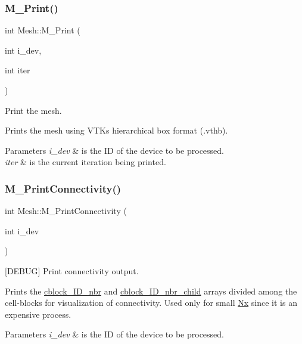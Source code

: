 \subsubsection{\texorpdfstring{M\+\_\+\+Print()}{M\_Print()}}
{\footnotesize\ttfamily int Mesh\+::\+M\+\_\+\+Print (\begin{DoxyParamCaption}\item[{int}]{i\+\_\+dev,  }\item[{int}]{iter }\end{DoxyParamCaption})}



Print the mesh. 

Prints the mesh using V\+TK\textquotesingle{}s hierarchical box format (.vthb). 
\begin{DoxyParams}{Parameters}
{\em i\+\_\+dev} & is the ID of the device to be processed. \\
\hline
{\em iter} & is the current iteration being printed. \\
\hline
\end{DoxyParams}
\mbox{\label{classMesh_a4d6deb8379e8f8573d17915a14eede30}} 
\subsubsection{\texorpdfstring{M\+\_\+\+Print\+Connectivity()}{M\_PrintConnectivity()}}
{\footnotesize\ttfamily int Mesh\+::\+M\+\_\+\+Print\+Connectivity (\begin{DoxyParamCaption}\item[{int}]{i\+\_\+dev }\end{DoxyParamCaption})}



\mbox{[}D\+E\+B\+UG\mbox{]} Print connectivity output. 

Prints the \hyperlink{classMesh_a81d8e99aa31cb83a0f58805ef1f5ca86}{cblock\+\_\+\+I\+D\+\_\+nbr} and \hyperlink{classMesh_abb8b2b9b54bc8d342bd5db602063f133}{cblock\+\_\+\+I\+D\+\_\+nbr\+\_\+child} arrays divided among the cell-\/blocks for visualization of connectivity. Used only for small \hyperlink{cppspec_8h_af093d941bc37a7a3f38e1db6593d9633}{Nx} since it is an expensive process. 
\begin{DoxyParams}{Parameters}
{\em i\+\_\+dev} & is the ID of the device to be processed. \\
\hline
\end{DoxyParams}
\mbox{\label{classMesh_aa8af131d960c3a98cba329620a678ab4}} 
